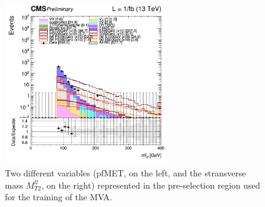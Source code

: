 \documentclass[a4paper, 10pt, openright]{report}
\begin{document}
\begin{figure}[htbp]
{\begin{minipage}[b]{.48\textwidth}
\end{minipage}\hfill
\begin{minipage}[b]{.48\textwidth}
\includegraphics[width=7cm, height=7cm]{figs/2017/log_cratio_topCR_ll_mt2ll.png}
\end{minipage} \hfill
}
\caption{Two different variables (pf\ac{MET}, on the left, and the stransverse mass $M_{T2}^{ll}$, on the right) represented in the pre-selection region used for the training of the \ac{MVA}.}
\label{fig:preSelSR}
\end{figure}
\end{document}
